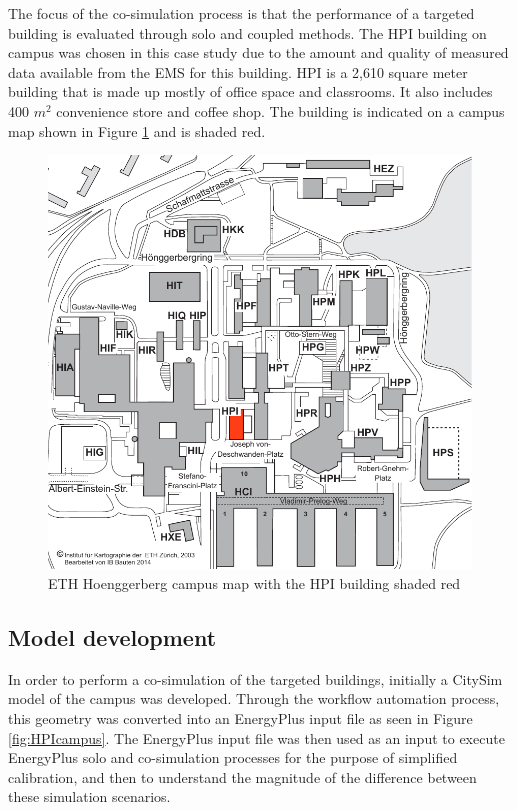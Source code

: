\documentclass{tBPS2e}
\theoremstyle{plain}
\theoremstyle{definition}
\theoremstyle{remark}
\begin{document}
The focus of the co-simulation process is that the performance of a targeted
building is evaluated through solo and coupled methods. The HPI building on
campus was chosen in this case study due to the amount and quality of measured
data available from the EMS for this building. HPI is a 2,610 square meter
building that is made up mostly of office space and classrooms. It also
includes 400 $m^2$ convenience store and coffee shop. The building is
indicated on a campus map shown in Figure \ref{fig:campusmap} and is shaded
red.

\begin{figure}[H]
\centering
\includegraphics[scale=0.5]{figures/ETH_Hoenngerbergcamp_targetedbuildings_HPI}
\caption{ETH Hoenggerberg campus map with the HPI building shaded red}
\label{fig:campusmap}
\end{figure}

\subsection{Model development}
In order to perform a co-simulation of the targeted buildings, initially a
CitySim model of the campus was developed. Through the workflow automation
process, this geometry was converted into an EnergyPlus input file as seen in
Figure \ref{fig:HPIcampus}. The EnergyPlus input file was then used as an input
to execute EnergyPlus solo and co-simulation processes for the purpose of
simplified calibration, and then to understand the magnitude of the difference
between these simulation scenarios.
\end{document}
